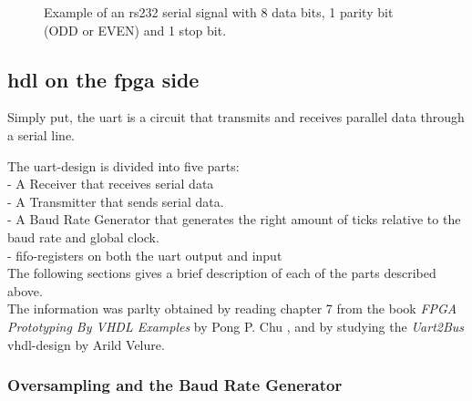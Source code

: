 \documentclass[main.tex]{subfiles}
\begin{document}
\begin{figure}[!h]
\begin{center}

\caption{Example of an \gls{rs232} serial signal with 8 data bits, 1 parity bit (ODD or EVEN) and 1 stop bit.}
\label{fig:rs232}

\end{center}
\end{figure}





\subsection{\acrshort{hdl} on the \gls{fpga} side}

Simply put, the \gls{uart} is a circuit that transmits and receives parallel data through a serial line. \cite{chu08}

The \gls{uart}-design is divided into five parts:\\
- A Receiver that receives serial data\\
- A Transmitter that sends serial data.\\
- A Baud Rate Generator that generates the right amount of ticks relative to the baud rate and global clock.\\
- \Gls{fifo}-registers on both the \gls{uart} output and input\\

The following sections gives a brief description of each of the parts described above. \\
The information was parlty obtained by reading chapter 7 from the book \textit{FPGA Prototyping By VHDL Examples} by Pong P. Chu \cite{chu08}, and by studying the \textit{Uart2Bus} \acrshort{vhdl}-design by Arild Velure.

\subsubsection{Oversampling and the Baud Rate Generator}
\end{document}
